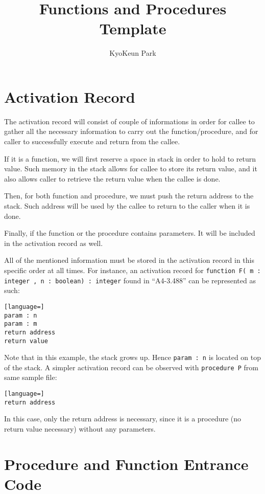 \documentclass{article}
\title{Functions and Procedures Template}
\author{KyoKeun Park}
\begin{document}
\maketitle

\section{Activation Record} \label{rec}

The activation record will consist of couple of informations in order for callee to gather all the necessary information to carry out the function/procedure, and for caller to successfully execute and return from the callee.

If it is a function, we will first reserve a space in stack in order to hold to return value. Such memory in the stack allows for callee to store its return value, and it also allows caller to retrieve the return value when the callee is done.

Then, for both function and procedure, we must push the return address to the stack. Such address will be used by the callee to return to the caller when it is done.

Finally, if the function or the procedure contains parameters. It will be included in the activation record as well.

All of the mentioned information must be stored in the activation record in this specific order at all times. For instance, an activation record for {\tt function F( m : integer , n : boolean) : integer} found in ``A4-3.488'' can be represented as such:

\begin{lstlisting}[language=]
param : n
param : m
return address
return value
\end{lstlisting}

Note that in this example, the stack grows up. Hence {\tt param : n} is located on top of the stack. A simpler activation record can be observed with {\tt procedure P} from same sample file:

\begin{lstlisting}[language=]
return address
\end{lstlisting}

In this case, only the return address is necessary, since it is a procedure (no return value necessary) without any parameters.

\section{Procedure and Function Entrance Code}
\end{document}

